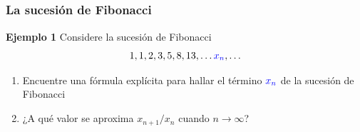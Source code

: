 
\subsection{}
%
\begin{frame}\frametitle{La sucesión de Fibonacci}
	
	\begin{ej}{\textbf{Ejemplo 1}}\justifying
		Considere la sucesión de Fibonacci
		\[
		1, 1, 2, 3, 5, 8, 13,\hdots {\color{blue}x_n},\hdots
		\]
		
		\vspace{-2mm}
		\begin{enumerate}[$a$]\justifying 
			\item Encuentre una fórmula explícita para hallar el término ${\color{blue}x_n}$ de la sucesión de Fibonacci
			\item ¿A qué valor se aproxima $x_{n+1}/x_n$ cuando $n\to \infty$?
		\end{enumerate}
	\end{ej}
	
\end{frame}

